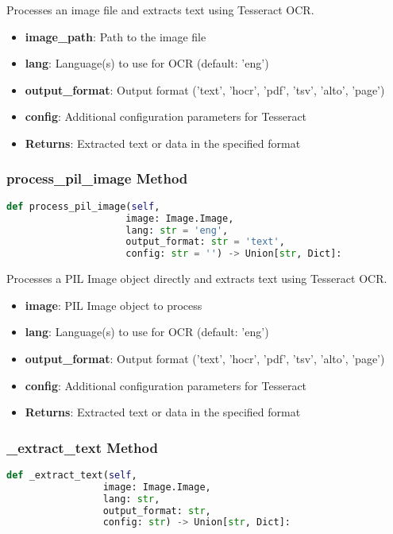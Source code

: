 Processes an image file and extracts text using Tesseract OCR.

\begin{itemize}
  \item \textbf{image\_path}: Path to the image file
  \item \textbf{lang}: Language(s) to use for OCR (default: 'eng')
  \item \textbf{output\_format}: Output format ('text', 'hocr', 'pdf', 'tsv', 'alto', 'page')
  \item \textbf{config}: Additional configuration parameters for Tesseract
  \item \textbf{Returns}: Extracted text or data in the specified format
\end{itemize}

\subsubsection{process\_pil\_image Method}

\begin{lstlisting}[language=Python]
def process_pil_image(self,
                     image: Image.Image,
                     lang: str = 'eng',
                     output_format: str = 'text',
                     config: str = '') -> Union[str, Dict]:
\end{lstlisting}

Processes a PIL Image object directly and extracts text using Tesseract OCR.

\begin{itemize}
  \item \textbf{image}: PIL Image object to process
  \item \textbf{lang}: Language(s) to use for OCR (default: 'eng')
  \item \textbf{output\_format}: Output format ('text', 'hocr', 'pdf', 'tsv', 'alto', 'page')
  \item \textbf{config}: Additional configuration parameters for Tesseract
  \item \textbf{Returns}: Extracted text or data in the specified format
\end{itemize}

\subsubsection{\_extract\_text Method}

\begin{lstlisting}[language=Python]
def _extract_text(self, 
                 image: Image.Image, 
                 lang: str, 
                 output_format: str, 
                 config: str) -> Union[str, Dict]:
\end{lstlisting}

